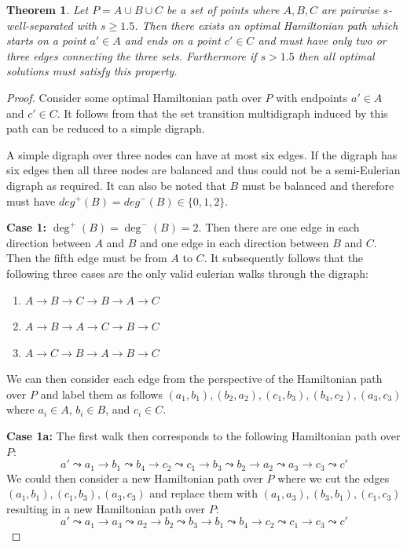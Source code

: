 \documentclass{article}
\newtheorem{thm}{Theorem}[section]
\theoremstyle{definition}
\begin{document}
\begin{thm}\label{thm:triple_wsp_path_ac}
    Let $P = A \cup B \cup C$ be a set of points where $A,B,C$ are pairwise $s$-well-separated with $s \geq 1.5$. 
    Then there exists an optimal Hamiltonian path which starts on a point $a' \in A$ and ends on a point $c' \in C$ and must have only two or three edges connecting the three sets.
    Furthermore if $s > 1.5$ then all optimal solutions must satisfy this property.
\end{thm}
\begin{proof}
    Consider some optimal Hamiltonian path over $P$ with endpoints $a' \in A$ and $c' \in C$.
    It follows from  that the set transition multidigraph induced by this path can be reduced to a simple digraph.

    A simple digraph over three nodes can have at most six edges.
    If the digraph has six edges then all three nodes are balanced and thus could not be a semi-Eulerian digraph as required.
    It can also be noted that $B$ must be balanced and therefore must have $deg^+(B) = deg^-(B) \in \{0,1,2\}$.

    \textbf{Case 1:} $\deg^+(B) = \deg^-(B) = 2$. %
    Then there are one edge in each direction between $A$ and $B$ and one edge in each direction between $B$ and $C$.
    Then the fifth edge must be from $A$ to $C$.
    It subsequently follows that the following three cases are the only valid eulerian walks through the digraph:
    \begin{enumerate}
        \item $A \to B \to C \to B \to A \to C$
        \item $A \to B \to A \to C \to B \to C$
        \item $A \to C \to B \to A \to B \to C$
    \end{enumerate}
    We can then consider each edge from the perspective of the Hamiltonian path over $P$ and label them as follows $(a_1, b_1), (b_2, a_2), (c_1, b_3), (b_4, c_2), (a_3, c_3)$ where $a_i \in A$, $b_i \in B$, and $c_i \in C$.
    
    \textbf{Case 1a:} The first walk then corresponds to the following Hamiltonian path over $P$:
    $$a' \leadsto a_1 \to b_1 \leadsto b_4 \to c_2 \leadsto c_1 \to b_3 \leadsto b_2 \to a_2 \leadsto a_3 \to c_3 \leadsto c'$$
    We could then consider a new Hamiltonian path over $P$ where we cut the edges $(a_1, b_1), (c_1, b_3), (a_3, c_3)$ and replace them with $(a_1, a_3), (b_3, b_1), (c_1, c_3)$ resulting in a new Hamiltonian path over $P$:
    $$a' \leadsto a_1 \to a_3 \leadsto a_2 \to b_2 \leadsto b_3 \to b_1 \leadsto b_4 \to c_2 \leadsto c_1 \to c_3 \leadsto c'$$


\end{proof}
\end{document}
